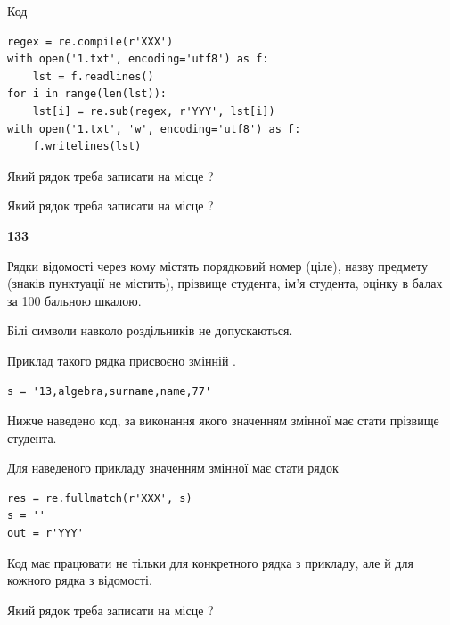 Код



\begin{verbatim}
regex = re.compile(r'XXX')
with open('1.txt', encoding='utf8') as f:
    lst = f.readlines()
for i in range(len(lst)):
    lst[i] = re.sub(regex, r'YYY', lst[i])
with open('1.txt', 'w', encoding='utf8') as f:
    f.writelines(lst)
\end{verbatim}







Який рядок треба записати на місце  ?\par
\vspace{5mm}


Який рядок треба записати на місце  ?\par


\newpage

{\begin {center}\textbf{ 133}\end {center}}\par
Рядки відомості через кому містять порядковий номер (ціле), назву предмету (зна\-ків пунктуації не містить), прізвище студента, ім'я студента, оцінку в балах за 100 бальною шкалою.

Білі символи навколо роздільників не допускаються.

Приклад такого рядка присвоєно змінній .



\begin{verbatim}
s = '13,algebra,surname,name,77'
\end{verbatim}


Нижче наведено код, за виконання якого значенням змінної  має стати прізвище студента.

Для наведеного прикладу значенням змінної  має стати рядок 



\begin{verbatim}
res = re.fullmatch(r'XXX', s)
s = ''
out = r'YYY'
\end{verbatim}


Код має працювати не тільки для конкретного рядка з прикладу, але й для кожного рядка з відомості.




Який рядок треба записати на місце  ?\par
\vspace{5mm}


